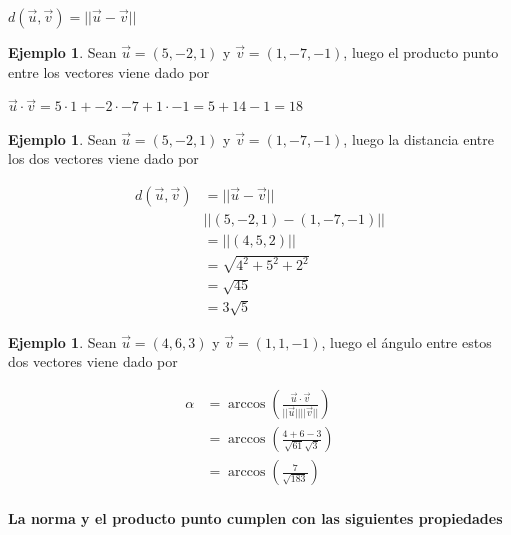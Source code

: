 \documentclass{article}
\theoremstyle{plain}
\theoremstyle{definition}
\newtheorem{ejem}[thm]{Ejemplo}
\begin{document}
\begin{center}
$d(\overrightarrow{u} ,\overrightarrow{v} ) = || \overrightarrow{u} -\overrightarrow{v} || $
\end{center}

\begin{ejem}Sean $\overrightarrow{u} = (5,-2,1)$ y $\overrightarrow{v} = (1,-7,-1) $, luego el producto punto entre los vectores viene dado por
\end{ejem}

\begin{center}
$\overrightarrow{u} \cdot \overrightarrow{v} = 5 \cdot 1 + -2 \cdot -7 + 1 \cdot -1 = 5+14-1 =18 $
\end{center}


\begin{ejem}Sean $\overrightarrow{u} = (5,-2,1)$ y $\overrightarrow{v} = (1,-7,-1) $, luego la distancia entre los dos vectores viene dado por
\end{ejem}


\begin{align*}
d(\overrightarrow{u} ,\overrightarrow{v} ) &= || \overrightarrow{u} -\overrightarrow{v} || \\
& ||(5,-2,1)-(1,-7,-1)|| \\
&= || (4,5,2)|| \\
&= \sqrt{4^2+5^2+2^2}\\
&= \sqrt{45} \\
&= 3\sqrt{5}
\end{align*}

\newpage



\begin{ejem}Sean $\overrightarrow{u} = (4,6,3)$ y $\overrightarrow{v} = (1,1,-1) $, luego el ángulo entre estos dos vectores viene dado por
\end{ejem}


\begin{align*}
\displaystyle \alpha &= \arccos\left( \frac{\overrightarrow{u} \cdot \overrightarrow{v}}{|| \overrightarrow{u} || ||\overrightarrow{v}||} \right)  \\
&= \arccos\left( \frac{4+6-3}{\sqrt{61} \sqrt{3}} \right)  \\
&= \arccos\left( \frac{7}{\sqrt{183}} \right)  \\
\end{align*}


\textbf{La norma y el producto punto cumplen con las siguientes propiedades}
\end{document}
